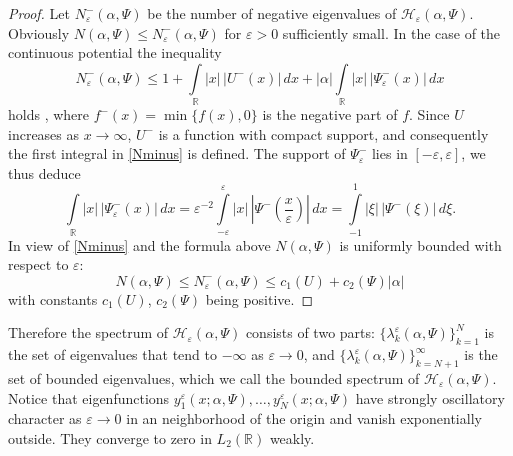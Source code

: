 \documentclass[11pt,english]{amsart}
\begin{document}
\begin{proof}
Let $N_\varepsilon^-(\alpha,\Psi)$ be the number of negative eigenvalues of $\mathcal{H}_{\varepsilon}(\alpha,\Psi)$.
Obviously $N(\alpha,\Psi)\leq N_\varepsilon^-(\alpha,\Psi)$ for $\varepsilon>0$ sufficiently small.
In the case of the continuous potential the inequality
\begin{equation}\label{Nminus}
   N_\varepsilon^-(\alpha,\Psi)\leq 1+\int\limits_{\mathbb R} |x|\,|U^-(x)|\,dx+|\alpha|\int\limits_{\mathbb R} |x|\,|\Psi^-_\varepsilon(x)|\,dx
\end{equation}
holds \cite[p.97]{BS}, where $f^-(x)=\min\{f(x), 0\}$ is the negative part of $f$.
Since $U$
increases as $x\to \infty$, $U^-$ is a function with compact support, and consequently
the first integral in \eqref{Nminus} is defined.
The support of $\Psi^-_\varepsilon$ lies in $[-\varepsilon,\varepsilon]$, we thus deduce
\begin{equation*}
\int\limits_{\mathbb R}
|x|\,|\Psi^-_\varepsilon(x)|\,dx=\varepsilon^{-2}\int\limits_{-\varepsilon}^{\varepsilon}
|x|\,|\Psi^-(\frac{x}{\varepsilon})|\,dx= \int\limits_{-1}^{1} |\xi|\,|\Psi^-(\xi)|\,d\xi.
\end{equation*}
In view of \eqref{Nminus} and the formula above
$N(\alpha,\Psi)$ is uniformly bounded with respect to  $\varepsilon$:
$$N(\alpha,\Psi)\leq N_\varepsilon^-(\alpha,\Psi)\leq c_1(U)+c_2(\Psi)|\alpha|$$
with constants $c_1(U)$, $c_2(\Psi)$  being positive.
\end{proof}

Therefore   the spectrum of $\mathcal{H_{\varepsilon}}(\alpha,\Psi)$ consists of two parts:
$\{\lambda_k^\varepsilon(\alpha, \Psi)\}_{k=1}^N$ is the set of eigenvalues that tend to $-\infty$ as $\varepsilon\to 0$, and
$\{\lambda_k^\varepsilon(\alpha, \Psi)\}_{k=N+1}^\infty$ is the set of bounded eigenvalues,
which we  call the bounded spectrum of $\mathcal{H_{\varepsilon}}(\alpha,\Psi)$. Notice that
eigenfunctions $y_1^\varepsilon(x;\alpha, \Psi), \dots, y_N^\varepsilon(x;\alpha, \Psi)$ have strongly oscillatory character as $\varepsilon\to 0$ in an neighborhood of the origin and vanish exponentially outside.
They converge to zero in $L_2(\mathbb{R})$ weakly.
\end{document}

